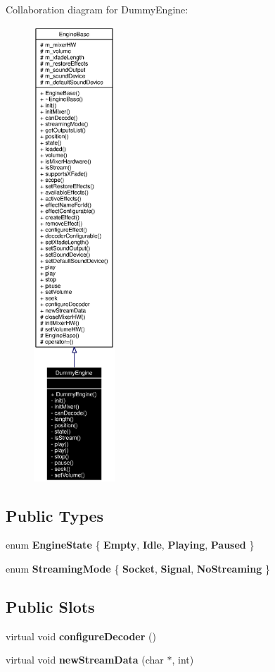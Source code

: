 Collaboration diagram for Dummy\-Engine:\begin{figure}[H]
\begin{center}
\leavevmode
\includegraphics[width=86pt]{classDummyEngine__coll__graph}
\end{center}
\end{figure}
\subsection*{Public Types}
\begin{CompactItemize}
\item 
enum {\bf Engine\-State} \{ {\bf Empty}, 
{\bf Idle}, 
{\bf Playing}, 
{\bf Paused}
 \}
\item 
enum {\bf Streaming\-Mode} \{ {\bf Socket}, 
{\bf Signal}, 
{\bf No\-Streaming}
 \}
\end{CompactItemize}
\subsection*{Public Slots}
\begin{CompactItemize}
\item 
virtual void {\bf configure\-Decoder} ()
\item 
virtual void {\bf new\-Stream\-Data} (char $\ast$, int)
\end{CompactItemize}
